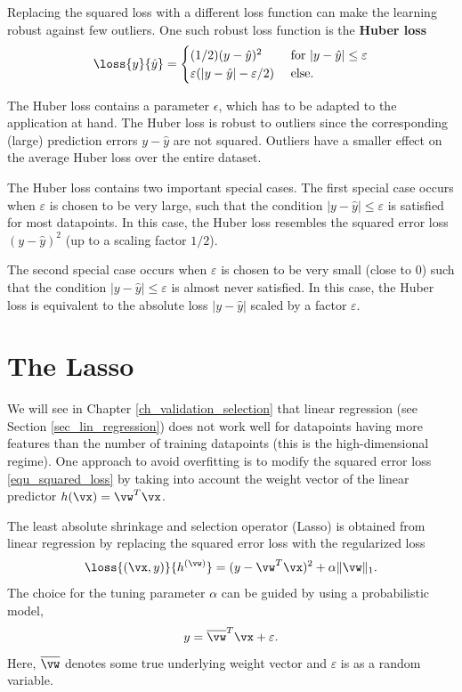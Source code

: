 \documentclass[12pt]{report}
\begin{document}
Replacing the squared loss with a different loss function can 
make the learning robust against few outliers. One such robust 
loss function is the {\bf Huber loss} \cite{HuberRobustBook}
\begin{equation}
\loss{y}{\hat{y}} = \begin{cases} (1/2) (y-\hat{y})^{2} & \mbox{ for } |y-\hat{y}| \leq   \varepsilon \\ 
\varepsilon(|y-\hat{y}| - \varepsilon/2) & \mbox{ else. }\end{cases}
\end{equation}

The Huber loss contains a parameter $\epsilon$, which has to 
be adapted to the application at hand. The Huber loss is robust 
to outliers since the corresponding (large) prediction errors 
$y - \hat{y}$ are not squared. Outliers have a smaller effect 
on the average Huber loss over the entire dataset. 

The Huber loss contains two important special cases. 
The first special case occurs when $\varepsilon$ 
is chosen to be very large, such that the condition 
$|y-\hat{y}| \leq \varepsilon$ is satisfied for most 
datapoints. In this case, the Huber loss resembles 
the squared error loss $(y-\hat{y})^{2}$ (up to a scaling factor $1/2$). 

The second special case occurs when $\varepsilon$ is chosen 
to be very small (close to $0$) such that the condition $|y-\hat{y}| \leq \varepsilon$ 
is almost never satisfied. In this case, the Huber loss is equivalent 
to the absolute loss $|y - \hat{y}|$ scaled by a factor $\varepsilon$.

\section{The Lasso}
\label{sec_lasso}
We will see in Chapter \ref{ch_validation_selection} that linear 
regression (see Section \ref{sec_lin_regression}) does not work 
well for datapoints having more features than the number of 
training datapoints (this is the high-dimensional regime). 
One approach to avoid overfitting is to modify the squared error 
loss \eqref{equ_squared_loss} by taking into account the weight 
vector of the linear predictor $h(\vx) = \vw^{T}\vx$. 

The least absolute shrinkage and selection operator (Lasso) is 
obtained from linear regression by replacing the squared error loss 
with the regularized loss 
\begin{equation}
\loss{(\vx,y)}{h^{(\vw)}} = (y-\vw^{T}\vx)^{2} + \alpha \| \vw \|_{1}. 
\end{equation}
The choice for the tuning parameter $\alpha$ can be guided 
by using a probabilistic model, 
$$ y = \overline{\vw}^{T} \vx + \varepsilon.$$ 
Here, $\overline{\vw}$ denotes some true underlying weight vector 
and $\varepsilon$ is as a random variable. 
\end{document}
